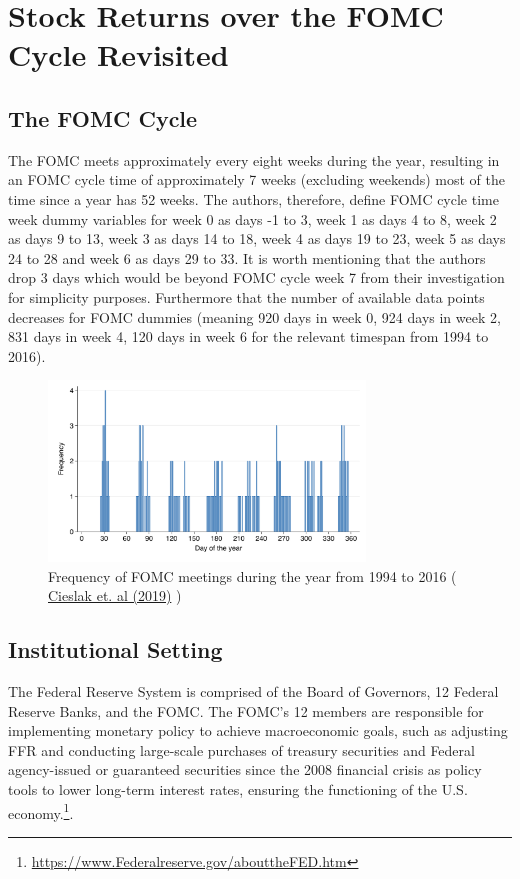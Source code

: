 \chapter{Stock Returns over the FOMC Cycle Revisited }


\section{The FOMC Cycle}

The FOMC meets approximately every eight weeks during the year,  resulting in an FOMC cycle time of approximately 7 weeks (excluding weekends) most of the time since a year has 52 weeks. The authors, therefore, define FOMC cycle time week dummy variables for week 0 as days -1 to 3, week 1 as days 4 to 8,  week 2 as days 9 to 13, week 3 as days 14 to 18, week 4 as days 19 to 23, week 5 as days 24 to 28 and week 6 as days 29 to 33. It is worth mentioning that the authors drop 3 days which would be beyond FOMC cycle week 7 from their investigation for simplicity purposes. Furthermore that the number of available data points decreases for FOMC dummies (meaning 920 days in week 0,  924 days in week 2,  831 days in week 4,  120 days in week 6 for the relevant timespan from 1994 to 2016).

\label{cies19_fig2}
\begin{figure}[h]
    \centering
    \includegraphics[width=0.75\textwidth]{figures/cies19/fig2}
    \caption{Frequency of FOMC meetings during the year from 1994 to 2016 ( \hyperref[item:cieslak_stock_2019]{Cieslak et. al (2019)} )}
\end{figure}


\section{Institutional Setting}

The Federal Reserve System is comprised of the Board of Governors, 12 Federal Reserve Banks, and the FOMC. The FOMC's 12 members are responsible for implementing monetary policy to achieve macroeconomic goals, such as adjusting FFR and conducting large-scale purchases of treasury securities and Federal agency-issued or guaranteed securities since the 2008 financial crisis as policy tools to lower long-term interest rates, ensuring the functioning of the U.S. economy.\footnote{\url{https://www.Federalreserve.gov/abouttheFED.htm}}. 

